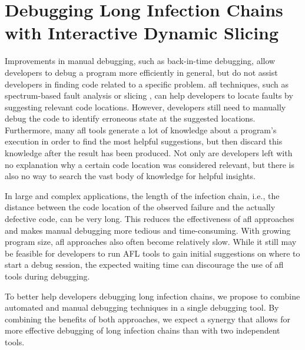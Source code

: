 \chapter{Debugging Long Infection Chains with Interactive Dynamic Slicing}

Improvements in manual debugging, such as back-in-time debugging, allow developers to debug a program more efficiently in general, but do not assist developers in finding code related to a specific problem.
\Ac{afl} techniques, such as spectrum-based fault analysis or slicing , can help developers to locate faults by suggesting relevant code locations.
However, developers still need to manually debug the code to identify erroneous state at the suggested locations.
Furthermore, many \ac{afl} tools generate a lot of knowledge about a program's execution in order to find the most helpful suggestions, but then discard this knowledge after the result has been produced.
Not only are developers left with no explanation why a certain code location was considered relevant, but there is also no way to search the vast body of knowledge for helpful insights.

In large and complex applications, the length of the infection chain, i.e., the distance between the code location of the observed failure and the actually defective code, can be very long.
This reduces the effectiveness of \ac{afl} approaches and makes manual debugging more tedious and time-consuming.
With growing program size, \ac{afl} approaches also often become relatively slow.
While it still may be feasible for developers to run AFL tools to gain initial suggestions on where to start a debug session, the expected waiting time can discourage the use of \ac{afl} tools during debugging.

To better help developers debugging long infection chains, we propose to combine automated and manual debugging techniques in a single debugging tool. 
By combining the benefits of both approaches, we expect a synergy that allows for more effective debugging of long infection chains than with two independent tools.


